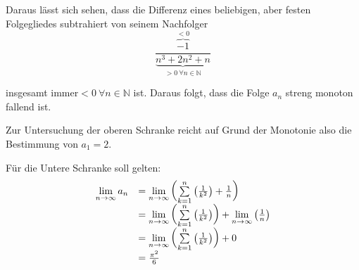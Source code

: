 Daraus lässt sich sehen, dass die Differenz eines beliebigen, aber festen Folgegliedes subtrahiert von seinem Nachfolger
\begin{equation*}
  \frac{\overbrace{-1}^{< 0}}{\underbrace{n^{3} +2n^{2} +n}_{ >0\ \forall n\in \mathbb{N}}}
\end{equation*}


insgesamt immer$\displaystyle < 0\ \forall n\in \mathbb{N}$ ist. Daraus folgt, dass die Folge $\displaystyle a_{n}$ streng monoton fallend ist.



Zur Untersuchung der oberen Schranke reicht auf Grund der Monotonie also die Bestimmung von $\displaystyle a_{1} =2$.



Für die Untere Schranke soll gelten:
\begin{equation*}
  \begin{array}{ c l }
    \lim\limits _{n\rightarrow \infty } a_{n} & =\lim\limits _{n\rightarrow \infty }\left(\sum\limits _{k=1}^{n}\left(\frac{1}{k^{2}}\right) +\frac{1}{n}\right)\\
    & =\lim\limits _{n\rightarrow \infty }\left(\sum\limits _{k=1}^{n}\left(\frac{1}{k^{2}}\right)\right) +\lim\limits _{n\rightarrow \infty }\left(\frac{1}{n}\right)\\
    & =\lim\limits _{n\rightarrow \infty }\left(\sum\limits _{k=1}^{n}\left(\frac{1}{k^{2}}\right)\right) +0\\
    & =\frac{\pi ^{2}}{6}
  \end{array}
\end{equation*}